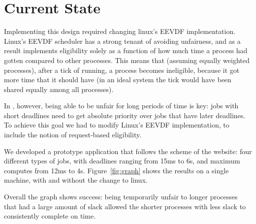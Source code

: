 \section{Current State}

Implementing this design required changing linux's EEVDF implementation. Linux's
EEVDF scheduler has a strong tenant of avoiding unfairness, and as a result
implements eligibility solely as a function of how much time a process had
gotten compared to other processes. This means that (assuming equally weighted
processes), after a tick of running, a process becomes ineligible, because it
got more time that it should have (in an ideal system the tick would have been
shared equally among all processes).

In \sysname, however, being able to be unfair for long periods of time is key:
jobs with short deadlines need to get absolute priority over jobs that have
later deadlines. To achieve this goal we had to modify Linux's EEVDF
implementation, to include the notion of request-based eligibility.

We developed a prototype application that follows the scheme of the website:
four different types of jobs, with deadlines ranging from 15ms to 6s, and
maximum computes from 12ms to 4s. Figure~\ref{fig:graph} shows the results on a
single machine, with and without the change to linux. 

Overall the graph shows success: being temporarily unfair to longer processes
that had a large amount of slack allowed the shorter processes with less slack
to consistently complete on time.